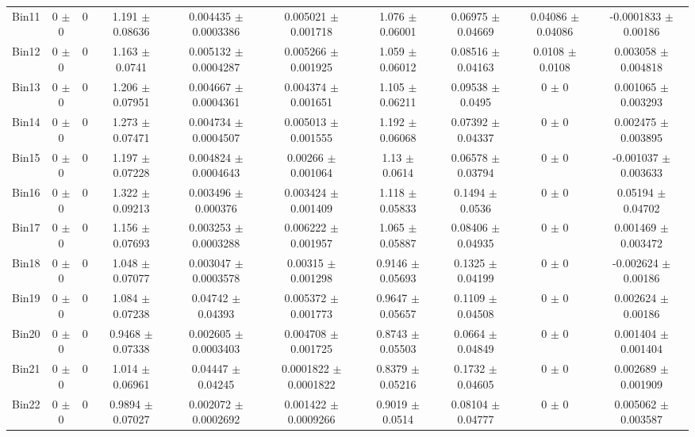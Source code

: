 \begin{tabular}{@{\extracolsep{4pt}}lccccccccc@{}}
     Bin11 & 0 $\pm$ 0 & 0 & 1.191 $\pm$ 0.08636 & 0.004435 $\pm$ 0.0003386 & 0.005021 $\pm$ 0.001718 & 1.076 $\pm$ 0.06001 & 0.06975 $\pm$ 0.04669 & 0.04086 $\pm$ 0.04086 & -0.0001833 $\pm$ 0.00186 \\ 
     Bin12 & 0 $\pm$ 0 & 0 & 1.163 $\pm$ 0.0741 & 0.005132 $\pm$ 0.0004287 & 0.005266 $\pm$ 0.001925 & 1.059 $\pm$ 0.06012 & 0.08516 $\pm$ 0.04163 & 0.0108 $\pm$ 0.0108 & 0.003058 $\pm$ 0.004818 \\ 
     Bin13 & 0 $\pm$ 0 & 0 & 1.206 $\pm$ 0.07951 & 0.004667 $\pm$ 0.0004361 & 0.004374 $\pm$ 0.001651 & 1.105 $\pm$ 0.06211 & 0.09538 $\pm$ 0.0495 & 0 $\pm$ 0 & 0.001065 $\pm$ 0.003293 \\ 
     Bin14 & 0 $\pm$ 0 & 0 & 1.273 $\pm$ 0.07471 & 0.004734 $\pm$ 0.0004507 & 0.005013 $\pm$ 0.001555 & 1.192 $\pm$ 0.06068 & 0.07392 $\pm$ 0.04337 & 0 $\pm$ 0 & 0.002475 $\pm$ 0.003895 \\ 
     Bin15 & 0 $\pm$ 0 & 0 & 1.197 $\pm$ 0.07228 & 0.004824 $\pm$ 0.0004643 & 0.00266 $\pm$ 0.001064 & 1.13 $\pm$ 0.0614 & 0.06578 $\pm$ 0.03794 & 0 $\pm$ 0 & -0.001037 $\pm$ 0.003633 \\ 
     Bin16 & 0 $\pm$ 0 & 0 & 1.322 $\pm$ 0.09213 & 0.003496 $\pm$ 0.000376 & 0.003424 $\pm$ 0.001409 & 1.118 $\pm$ 0.05833 & 0.1494 $\pm$ 0.0536 & 0 $\pm$ 0 & 0.05194 $\pm$ 0.04702 \\ 
     Bin17 & 0 $\pm$ 0 & 0 & 1.156 $\pm$ 0.07693 & 0.003253 $\pm$ 0.0003288 & 0.006222 $\pm$ 0.001957 & 1.065 $\pm$ 0.05887 & 0.08406 $\pm$ 0.04935 & 0 $\pm$ 0 & 0.001469 $\pm$ 0.003472 \\ 
     Bin18 & 0 $\pm$ 0 & 0 & 1.048 $\pm$ 0.07077 & 0.003047 $\pm$ 0.0003578 & 0.00315 $\pm$ 0.001298 & 0.9146 $\pm$ 0.05693 & 0.1325 $\pm$ 0.04199 & 0 $\pm$ 0 & -0.002624 $\pm$ 0.00186 \\ 
     Bin19 & 0 $\pm$ 0 & 0 & 1.084 $\pm$ 0.07238 & 0.04742 $\pm$ 0.04393 & 0.005372 $\pm$ 0.001773 & 0.9647 $\pm$ 0.05657 & 0.1109 $\pm$ 0.04508 & 0 $\pm$ 0 & 0.002624 $\pm$ 0.00186 \\ 
     Bin20 & 0 $\pm$ 0 & 0 & 0.9468 $\pm$ 0.07338 & 0.002605 $\pm$ 0.0003403 & 0.004708 $\pm$ 0.001725 & 0.8743 $\pm$ 0.05503 & 0.0664 $\pm$ 0.04849 & 0 $\pm$ 0 & 0.001404 $\pm$ 0.001404 \\ 
     Bin21 & 0 $\pm$ 0 & 0 & 1.014 $\pm$ 0.06961 & 0.04447 $\pm$ 0.04245 & 0.0001822 $\pm$ 0.0001822 & 0.8379 $\pm$ 0.05216 & 0.1732 $\pm$ 0.04605 & 0 $\pm$ 0 & 0.002689 $\pm$ 0.001909 \\ 
     Bin22 & 0 $\pm$ 0 & 0 & 0.9894 $\pm$ 0.07027 & 0.002072 $\pm$ 0.0002692 & 0.001422 $\pm$ 0.0009266 & 0.9019 $\pm$ 0.0514 & 0.08104 $\pm$ 0.04777 & 0 $\pm$ 0 & 0.005062 $\pm$ 0.003587 \\ 

\end{tabular}
